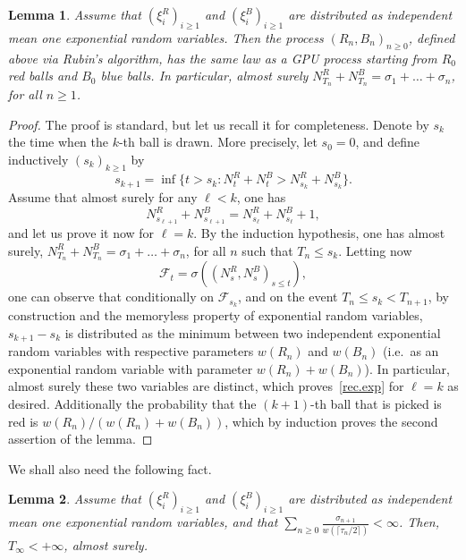 \documentclass[11pt]{article}
\newtheorem {lem} {Lemma} [section]
\newcommand{\1}{{\text{\Large $\mathfrak 1$}}}
\begin{document}
\begin{lem}\label{lem:Rubin}
Assume that $(\xi_i^R)_{i\ge 1}$ and $(\xi_i^B)_{i\ge 1}$ are distributed as independent mean one exponential random variables. Then the process $(R_n,B_n)_{n\ge 0}$, defined above via Rubin's algorithm,
has the same law as a GPU process starting from $R_0$ red balls and $B_0$ blue balls. In particular, almost surely $N_{T_n}^R + N_{T_n}^B = \sigma_1+ \dots + \sigma_n$, for all $n\ge 1$. 
\end{lem}
\begin{proof}
The proof is standard, but let us recall it for completeness. Denote by $s_k$ the time when the $k$-th ball is drawn. More precisely, let $s_0 = 0$, and define inductively $(s_k)_{k\ge 1}$ by 
$$s_{k+1} = \inf \{t>s_k : N_t^R + N_t^B > N_{s_k}^R + N_{s_k}^B\}. $$ 
Assume that almost surely for any $\ell < k$, one has 
\begin{equation}\label{rec.exp}
N_{s_{\ell +1}}^R + N_{s_{\ell +1}}^B = N_{s_\ell}^R + N_{s_\ell}^B +1,
\end{equation}
and let us prove it now for $\ell = k$. By the induction hypothesis, one has almost surely, $N_{T_n}^R + N_{T_n}^B = \sigma_1+ \dots + \sigma_n$, for all $n$ such that $T_n \le s_k$. 
Letting now 
\begin{equation}\label{def.Ft}
\mathcal F_t= \sigma((N_s^R,N_s^B)_{s\le t}),
\end{equation}
one can observe that conditionally on $\mathcal F_{s_k}$, and on the event $T_n\le s_k <T_{n+1}$, by construction and the memoryless property of exponential random variables, $s_{k+1} - s_k$ is distributed as the minimum between two independent exponential random variables with respective parameters $w(R_n)$ and $w(B_n)$ (i.e.~as an exponential random variable with parameter $w(R_n) + w(B_n)$). In particular, almost surely these two variables are distinct, which proves~\eqref{rec.exp} for $\ell = k$ as desired. Additionally the probability that the $(k+1)$-th ball 
that is picked is red is $w(R_n)/(w(R_n) + w(B_n))$, which by induction proves the second assertion of the lemma. 
\end{proof}
We shall also need the following fact. 
\begin{lem}\label{lem.Rubin2}
Assume that $(\xi_i^R)_{i\ge 1}$ and $(\xi_i^B)_{i\ge 1}$ are distributed as independent mean one exponential random variables, and that $\sum_{n\ge 0} \frac{\sigma_{n+1}}{w(\lceil \tau_n/2\rceil)}<\infty$. 
Then, $T_\infty<+\infty$, almost surely. 
\end{lem}
\end{document}
